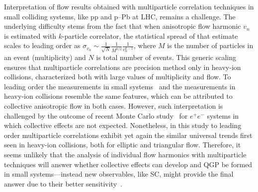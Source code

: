 \documentclass[ALICE,manyauthors]{cernphprep}
\begin{document}
Interpretation of flow results obtained with multiparticle correlation techniques in small colliding systems, like pp and p--Pb at LHC, remains a challenge. The underlying difficulty stems from the fact that when anisotropic flow harmonic $v_n$ is estimated with $k$-particle correlator, the statistical spread of that estimate scales to leading order as $\sigma_{v_{n}}\sim\frac{1}{\sqrt{N}}\frac{1}{M^{k/2}}\frac{1}{v_{n}^{k-1}}$, where $M$ is the number of particles in an event (multiplicity) and $N$ is total number of events. This generic scaling ensures that multiparticle correlations are precision method only in heavy-ion collisions, characterized both with large values of multiplicity and flow. To leading order the measurements in small systems~\cite{Aad:2013fja,Abelev:2014mda,Khachatryan:2015waa,Adamczyk:2015xjc,Adare:2015ctn} and the measurements in heavy-ion collisions resemble the same features, which can be attributed to collective anisotropic flow in both cases. However, such interpretation is challenged by the outcome of recent Monte Carlo study~\cite{Loizides:2016tew} for $e^+e^-$ systems in which collective effects are not expected. Nonetheless, in this study to leading order multiparticle correlations exhibit yet again the similar universal trends first seen in heavy-ion collisions, both for elliptic and triangular flow. Therefore, it seems unlikely that the analysis of individual flow harmonics with multiparticle techniques will answer whether collective effects can develop and QGP be formed in small systems---instead new observables, like SC, might provide the final answer due to their better sensitivity~\cite{Niemi:2012aj,ALICE:2016kpq}.
\end{document}
